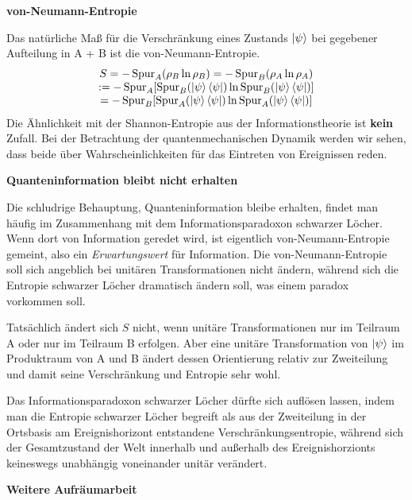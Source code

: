 \documentclass[12pt]{book}
\begin{document}
\textbf{von-Neumann-Entropie}

Das natürliche Maß für die Verschränkung eines Zustands $\ket{\psi}$ bei gegebener Aufteilung in A + B ist die von-Neumann-Entropie.
\begin{equation}
\label{eq:von_Neumann}
\begin{matrix}
S = - \operatorname{Spur}_A (\rho_B \ln \rho_B ) = - \operatorname{Spur}_B (\rho_A \ln \rho_A ) \\
:= - \operatorname{Spur}_A [\operatorname{Spur}_B(\ket{\psi}\bra{\psi}) \ln{\operatorname{Spur}_B(\ket{\psi}\bra{\psi})} ] \\
= - \operatorname{Spur}_B[\operatorname{Spur}_A(\ket{\psi}\bra{\psi}) \ln{\operatorname{Spur}_A(\ket{\psi}\bra{\psi})}] \\
\end{matrix}
\end{equation}
Die Ähnlichkeit mit der Shannon-Entropie aus der Informationstheorie ist \textbf{kein} Zufall. Bei der Betrachtung der quantenmechanischen Dynamik werden wir sehen, dass beide über Wahrscheinlichkeiten für das Eintreten von Ereignissen reden.

\textbf{Quanteninformation bleibt nicht erhalten}

Die schludrige Behauptung, Quanteninformation bleibe erhalten, findet man häufig im Zusammenhang mit dem Informationsparadoxon schwarzer Löcher. Wenn dort von Information geredet wird, ist eigentlich von-Neumann-Entropie gemeint, also ein \emph{Erwartungswert} für Information. Die von-Neumann-Entropie soll sich angeblich bei unitären Transformationen nicht ändern, während sich die Entropie schwarzer Löcher dramatisch ändern soll, was einem paradox vorkommen soll.

Tatsächlich ändert sich $S$ nicht, wenn unitäre Transformationen nur im Teilraum A oder nur im Teilraum B erfolgen. Aber eine unitäre Transformation von $\ket{\psi}$ im Produktraum von A und B ändert dessen Orientierung relativ zur Zweiteilung und damit seine Verschränkung und Entropie sehr wohl.

Das Informationsparadoxon schwarzer Löcher dürfte sich auflösen lassen, indem man die Entropie schwarzer Löcher begreift als aus der Zweiteilung in der Ortsbasis am Ereignishorizont entstandene Verschränkungsentropie, während sich der Gesamtzustand der Welt innerhalb und außerhalb des Ereignishorzionts keineswegs unabhängig voneinander unitär verändert.

\textbf{Weitere Aufräumarbeit}
\end{document}
